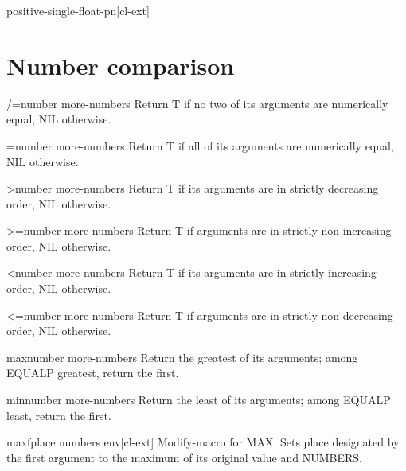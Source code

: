 \documentclass[10pt,english]{book}
\begin{document}
\begin{function}{positive-single-float-p}{n}[cl-ext]
  
\end{function}

\section{Number comparison}
\label{sec:number-comparison}

\begin{function}{/=}{number \rest more-numbers}
  Return T if no two of its arguments are numerically equal, NIL otherwise.
\end{function}

\begin{function}{=}{number \rest more-numbers}
  Return T if all of its arguments are numerically equal, NIL otherwise.
\end{function}

\begin{function}{>}{number \rest more-numbers}
  Return T if its arguments are in strictly decreasing order, NIL otherwise.
\end{function}

\begin{function}{>=}{number \rest more-numbers}
  Return T if arguments are in strictly non-increasing order, NIL otherwise.
\end{function}

\begin{function}{<}{number \rest more-numbers}
  Return T if its arguments are in strictly increasing order, NIL otherwise.
\end{function}

\begin{function}{<=}{number \rest more-numbers}
  Return T if arguments are in strictly non-decreasing order, NIL otherwise.
\end{function}

\begin{function}{max}{number \rest more-numbers}
  Return the greatest of its arguments; among EQUALP greatest, return
the first.
\end{function}

\begin{function}{min}{number \rest more-numbers}
  Return the least of its arguments; among EQUALP least, return
the first.
\end{function}

\begin{macro}{maxf}{place \rest numbers \env env}[cl-ext]
  Modify-macro for MAX. Sets place designated by the first argument to the
maximum of its original value and NUMBERS.
\end{macro}
\end{document}
